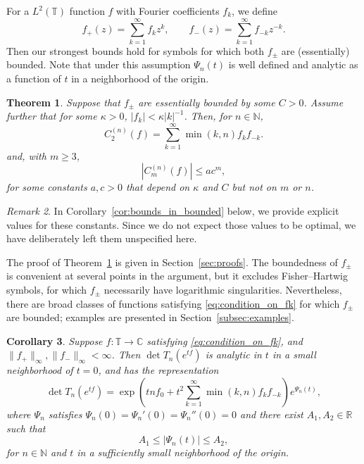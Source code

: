 \documentclass[11pt]{amsart}
\theoremstyle{plain}
\newtheorem{theorem}{Theorem}[section]
\newtheorem{corollary}[theorem]{Corollary}
\theoremstyle{remark}
\newtheorem{remark}[theorem]{Remark}
\numberwithin{equation}{section}
\begin{document}
For a $L^2(\mathbb T)$ function $f$ with Fourier coefficients $f_k$, we define 
$$
f_+(z)= \sum_{k=1}^\infty f_k z^k, \qquad  f_-(z)=\sum_{k=1}^\infty f_{-k}z^{-k}.
$$
Then our strongest bounds hold for symbols for which both $f_\pm$ are (essentially) bounded. Note that under this assumption $\Psi_n(t)$ is well defined and analytic as a function of $t$ in a neighborhood of the origin.


\begin{theorem}\label{thm:cumulants_bounded_and_decay}
Suppose that $f_{\pm}$ are essentially bounded by some $C>0$. Assume further that 
for some $\kappa>0$, $|f_k|<\kappa{|k|}^{-1}$. 
Then, for $n\in \mathbb N$,
\begin{equation}
    C_2^{(n)}(f)= \sum_{k=1}^\infty \min (k,n) f_kf_{-k}.  
\end{equation}
and, with $m\geq 3$,
\begin{equation}
|C_m^{(n)}(f)|\leq 
a c^m,
\end{equation}
for some constants $a,c>0$ that depend  on $ \kappa$ and $C$ but not on $m$ or $n$.
\end{theorem}
\begin{remark}
   In Corollary~\ref{cor:bounds_in_bounded} below, we provide explicit values for these constants. Since we do not expect those values to be optimal, we have deliberately left them unspecified here.
\end{remark}

The proof of Theorem~\ref{thm:cumulants_bounded_and_decay} is given in Section~\ref{sec:proofs}. The boundedness of \(f_\pm\) is convenient at several points in the argument, but it excludes Fisher--Hartwig symbols, for which \(f_\pm\) necessarily have logarithmic singularities. Nevertheless, there are broad classes of functions satisfying \eqref{eq:condition_on_fk} for which \(f_\pm\) are bounded; examples are presented in Section~\ref{subsec:examples}.

\begin{corollary}\label{cor:determinant_expansion}
Suppose $f:\mathbb{T}\rightarrow\mathbb{C}$ satisfying \eqref{eq:condition_on_fk},  and  $\|f_+\|_{\infty}, \|f_-\|_{\infty}< \infty$. Then $\det T_n(e^{tf})$ is analytic in $t$  in a small neighborhood of $t=0$, and has the representation
\begin{equation}
\det T_n(e^{tf})=\exp\left(tnf_0+ t^2\sum_{k=1}^\infty \min (k,n) f_kf_{-k}\right) e^{\Psi_n(t)},
\end{equation}
where $\Psi_n$ satisfies  $\Psi_n(0)=\Psi_n'(0)=\Psi_n''(0)=0$ and there exist $A_1,A_2\in \mathbb R$ such that 
$$
A_1\leq |\Psi_n(t)|\leq A_2,
$$
for $n \in \mathbb N$ and $t$ in a sufficiently small neighborhood of the origin.
\end{corollary}
\end{document}
